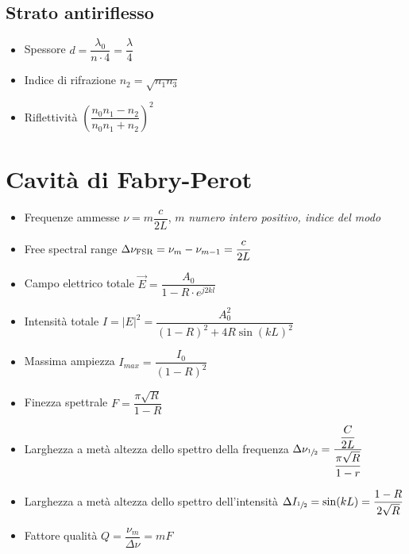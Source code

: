 \documentclass{article}
\begin{document}
\subsection{Strato antiriflesso}
\begin{itemize}
  \item Spessore \( d = \dfrac{\lambda_0}{n \cdot 4} = \dfrac{\lambda}{4} \)
  \item Indice di rifrazione \( n_2 = \sqrt{n_1 n_3} \)
  \item Riflettività \( \left( \dfrac{n_0 n_1 - n_2 }{n_0 n_1 + n_ 2} \right) ^ 2 \)
\end{itemize}

\newpage

\section {Cavità di Fabry-Perot}
\begin{itemize}
  \item Frequenze ammesse \(  \nu = m \dfrac{c}{2L} \), \( m \) \textit{numero intero positivo, indice del modo}
  \item Free spectral range \( \Delta \nu_{\textnormal{FSR}} = \nu_{m} - \nu_{m-1} = \dfrac{c}{2L} \)
  \item Campo elettrico totale \( \vec{E} = \dfrac{A_0}{1-R \cdot e^ {j 2 k l}} \)
  \item Intensità totale \( I = | E | ^ 2 = \dfrac{A_0^2}{(1-R)^2+ 4 R \sin(kL)^2} \)
  \item Massima ampiezza \( I_{max} = \dfrac{I_0}{(1-R)^2} \)
  \item Finezza spettrale \( F = \dfrac{\pi \sqrt{R}}{1-R} \)
  \item Larghezza a metà altezza dello spettro della frequenza \(\Delta \nu_{\sfrac{1}{2}} = \dfrac{\dfrac{C}{2L}}{\dfrac{\pi \sqrt{R}}{1 - r}} \)
  \item Larghezza a metà altezza dello spettro dell'intensità \(\Delta I_{\sfrac{1}{2}} = \sin(k L) = \dfrac{1 - R}{2 \sqrt{R}} \)
  \item Fattore qualità \( Q = \dfrac{\nu_m}{\Delta \nu} = m F \)
\end{itemize}

\newpage
\end{document}
